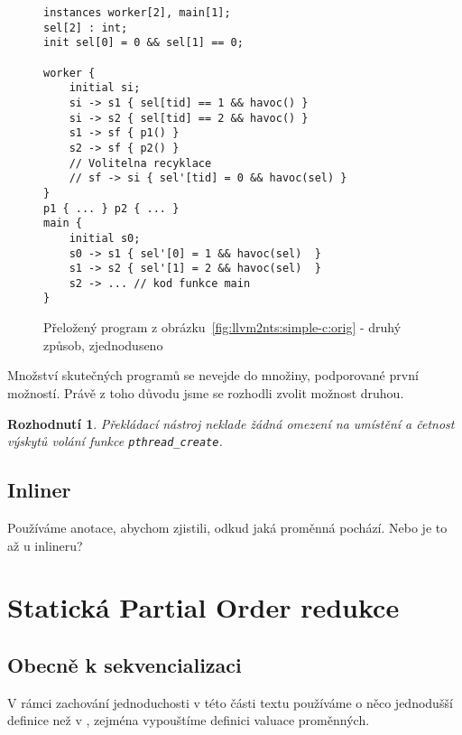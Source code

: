 \documentclass[10pt,a4paper,notitlepage]{report}
\newtheorem{decision}  {Rozhodnutí}
\begin{document}
\begin{figure}[t]
\begin{lstlisting}
instances worker[2], main[1];
sel[2] : int;
init sel[0] = 0 && sel[1] == 0;

worker {
	initial si;
	si -> s1 { sel[tid] == 1 && havoc() }
	si -> s2 { sel[tid] == 2 && havoc() }
	s1 -> sf { p1() }
	s2 -> sf { p2() }
	// Volitelna recyklace
	// sf -> si { sel'[tid] = 0 && havoc(sel) }
}
p1 { ... } p2 { ... }
main {
	initial s0;
	s0 -> s1 { sel'[0] = 1 && havoc(sel)  }
	s1 -> s2 { sel'[1] = 2 && havoc(sel)  }
	s2 -> ... // kod funkce main
}
\end{lstlisting}
\caption{Přeložený program z obrázku~\ref{fig:llvm2nts:simple-c:orig} - druhý způsob, zjednoduseno}
\label{fig:llvm2nts:simple-c:realworld-nts}
\end{figure}


Množství skutečných programů se nevejde do množiny, podporované první možností. Právě z toho důvodu jsme se rozhodli zvolit možnost druhou.

\begin{decision}\label{decision:real-world-programs}
Překládací nástroj neklade žádná omezení na umístění a četnost výskytů volání funkce \texttt{pthread\_create}.
\end{decision}

\section{Inliner}
Používáme anotace, abychom zjistili, odkud jaká proměnná pochází. Nebo je to až u inlineru?




\chapter{Statická Partial Order redukce}
\label{sec:nts-por}

\section{Obecně k sekvencializaci}
V rámci zachování jednoduchosti v této části textu používáme o něco jednodušší definice než v \cite{NTSref}, zejména vypouštíme definici valuace proměnných.
\end{document}
